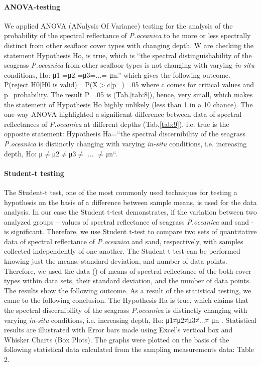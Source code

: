 \documentclass[10pt, a4paper]{article}
\begin{document}
\paragraph{ANOVA-testing}
We applied ANOVA (ANalysis Of Variance) testing for the analysis of the probability of the
spectral reflectance of \textit{P.oceanica} to be more or less spectrally distinct from other seafloor cover
types with changing depth. W are checking the statement Hypothesis Ho, is true, which is “the
spectral distinguishability of the seagrass \textit{P.oceanica} from other seafloor types is not changing with
varying \textit{in-situ} conditions, Ho: μ1 =μ2 =μ3=...= μn.” which gives the following outcome.
P(reject H0|H0 is valid)= P(X$>$c|p=)=.05
where c comes for critical values and p=probability.
The result P=.05 is (Tab.\ref{tab:8}), hence, very small, which makes the statement of Hypothesis Ho highly unlikely
(less than 1 in a 10 chance). The one-way ANOVA highlighted a significant difference between data
of spectral reflectances of \textit{P.oceanica} at different depths (Tab.\ref{tab:9}), i.e. true is the opposite statement:
Hypothesis Ha=“the spectral discernibility of the seagrass \textit{P.oceanica} is distinctly changing with
varying \textit{in-situ} conditions, i.e. increasing depth, Ho: μ$\neq$μ2$\neq$μ3$\neq$ ... $\neq$μn“.

\paragraph{Student-t testing}
The Student-t test, one of the most commonly used techniques for testing a hypothesis on the basis
of a difference between sample means, is used for the data analysis. In our case the Student t-test demonstrates, if the variation
between two analyzed groups – values of spectral reflectance of seagrass \textit{P.oceanica} and sand - is
significant. Therefore, we use Student t-test to compare two sets of quantitative data of spectral
reflectance of \textit{P.oceanica} and sand, respectively, with samples collected independently of one
another. The Student-t test can be performed knowing just the means, standard deviation, and number
of data points. Therefore, we used the data () of means of spectral reflectance of the both
 cover types within data sets, their standard deviation, and the number of data points.
The results show the following outcome.
As a result of the statistical testing, we came to the following conclusion.
The Hypothesis Ha is true, which claims that the spectral discernibility of the seagrass 	\textit{P.oceanica} is
distinctly changing with varying \textit{in-situ} conditions, i.e. increasing depth, Ho: μ1≠μ2≠μ3≠...≠ μn .
Statistical results are illustrated with Error bars made using Excel's vertical box and Whisker Charts
(Box Plots).
The graphs were plotted on the basis of the following statistical data calculated from the sampling
measurements data: Table 2.
\end{document}
